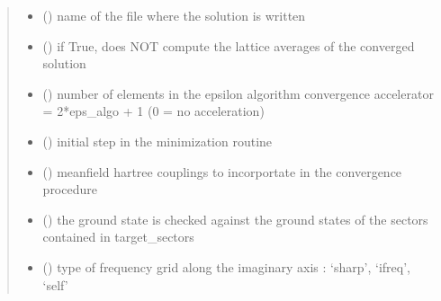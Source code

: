 \documentclass[letterpaper,10pt,english]{sphinxmanual}
\begin{document}
\begin{fulllineitems}
\begin{quote}
\begin{description}
\begin{itemize}
\item {} 
\sphinxAtStartPar
{} () \textendash{} name of the file where the solution is written

\item {} 
\sphinxAtStartPar
{} () \textendash{} if True, does NOT compute the lattice averages of the converged solution

\item {} 
\sphinxAtStartPar
{} () \textendash{} number of elements in the epsilon algorithm convergence accelerator = 2*eps\_algo + 1 (0 = no acceleration)

\item {} 
\sphinxAtStartPar
{} () \textendash{} initial step in the minimization routine

\item {} 
\sphinxAtStartPar
{} (\sphinxstyleliteralemphasis{\sphinxupquote{{[}}}\sphinxstyleliteralemphasis{\sphinxupquote{{]}}}) \textendash{} mean\sphinxhyphen{}field hartree couplings to incorportate in the convergence procedure

\item {} 
\sphinxAtStartPar
{} (\sphinxstyleliteralemphasis{\sphinxupquote{{[}}}\sphinxstyleliteralemphasis{\sphinxupquote{{]}}}) \textendash{} the ground state is checked against the ground states of the sectors contained in target\_sectors

\item {} 
\sphinxAtStartPar
{} () \textendash{} type of frequency grid along the imaginary axis : ‘sharp’, ‘ifreq’, ‘self’


\end{itemize}
\end{description}
\end{quote}
\end{fulllineitems}
\end{document}
